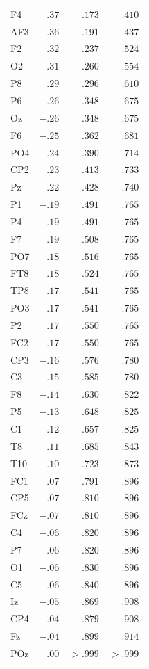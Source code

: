 {\begin{longtable}{lrrr}
F4 & $.37$ & $.173$ & $.410$ \\
AF3 & $-.36$ & $.191$ & $.437$ \\
F2 & $.32$ & $.237$ & $.524$ \\
O2 & $-.31$ & $.260$ & $.554$ \\
P8 & $.29$ & $.296$ & $.610$ \\
P6 & $-.26$ & $.348$ & $.675$ \\
Oz & $-.26$ & $.348$ & $.675$ \\
F6 & $-.25$ & $.362$ & $.681$ \\
PO4 & $-.24$ & $.390$ & $.714$ \\
CP2 & $.23$ & $.413$ & $.733$ \\
Pz & $.22$ & $.428$ & $.740$ \\
P1 & $-.19$ & $.491$ & $.765$ \\
P4 & $-.19$ & $.491$ & $.765$ \\
F7 & $.19$ & $.508$ & $.765$ \\
PO7 & $.18$ & $.516$ & $.765$ \\
FT8 & $.18$ & $.524$ & $.765$ \\
TP8 & $.17$ & $.541$ & $.765$ \\
PO3 & $-.17$ & $.541$ & $.765$ \\
P2 & $.17$ & $.550$ & $.765$ \\
FC2 & $.17$ & $.550$ & $.765$ \\
CP3 & $-.16$ & $.576$ & $.780$ \\
C3 & $.15$ & $.585$ & $.780$ \\
F8 & $-.14$ & $.630$ & $.822$ \\
P5 & $-.13$ & $.648$ & $.825$ \\
C1 & $-.12$ & $.657$ & $.825$ \\
T8 & $.11$ & $.685$ & $.843$ \\
T10 & $-.10$ & $.723$ & $.873$ \\
FC1 & $.07$ & $.791$ & $.896$ \\
CP5 & $.07$ & $.810$ & $.896$ \\
FCz & $-.07$ & $.810$ & $.896$ \\
C4 & $-.06$ & $.820$ & $.896$ \\
P7 & $.06$ & $.820$ & $.896$ \\
O1 & $-.06$ & $.830$ & $.896$ \\
C5 & $.06$ & $.840$ & $.896$ \\
Iz & $-.05$ & $.869$ & $.908$ \\
CP4 & $.04$ & $.879$ & $.908$ \\
Fz & $-.04$ & $.899$ & $.914$ \\
POz & $.00$ & $> .999$ & $> .999$ \\
\end{longtable}
}

